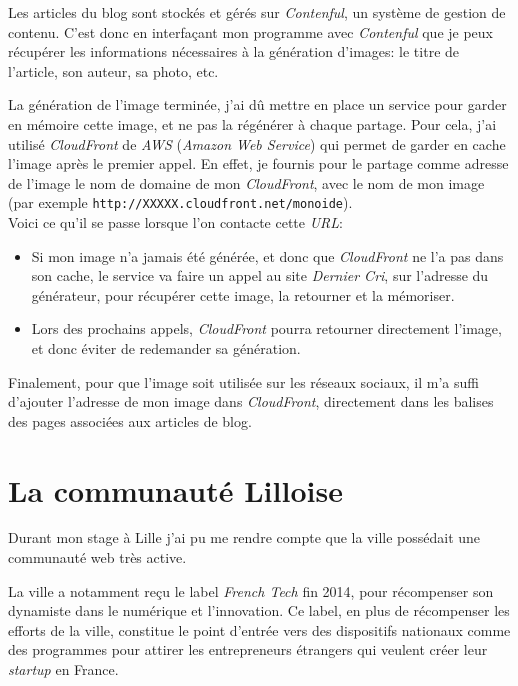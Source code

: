 \bigskip

Les articles du blog sont stockés et gérés sur \emph{Contenful}, un
système de gestion de contenu. C'est donc en interfaçant mon programme
avec \emph{Contenful} que je peux récupérer les informations nécessaires
à la génération d'images: le titre de l'article, son auteur, sa photo,
etc.

\bigskip

La génération de l'image terminée, j'ai dû mettre en place un service
pour garder en mémoire cette image, et ne pas la régénérer à chaque
partage. Pour cela, j'ai utilisé \emph{CloudFront} de \emph{AWS}
(\emph{Amazon Web Service}) qui permet de garder en cache l'image après
le premier appel. En effet, je fournis pour le partage comme adresse de
l'image le nom de domaine de mon \emph{CloudFront}, avec le nom de mon
image (par exemple \texttt{http://XXXXX.cloudfront.net/monoide}).\\
Voici ce qu'il se passe lorsque l'on contacte cette \emph{URL}:

\begin{itemize}
\item
  Si mon image n'a jamais été générée, et donc que \emph{CloudFront} ne
  l'a pas dans son cache, le service va faire un appel au site
  \emph{Dernier Cri}, sur l'adresse du générateur, pour récupérer cette
  image, la retourner et la mémoriser.
\item
  Lors des prochains appels, \emph{CloudFront} pourra retourner
  directement l'image, et donc éviter de redemander sa génération.
\end{itemize}

\bigskip

Finalement, pour que l'image soit utilisée sur les réseaux sociaux, il
m'a suffi d'ajouter l'adresse de mon image dans \emph{CloudFront},
directement dans les balises des pages associées aux articles de blog.

\newpage

\section{La communauté Lilloise}\label{la-communautuxe9-lilloise}

Durant mon stage à Lille j'ai pu me rendre compte que la ville possédait
une communauté web très active.

\bigskip

La ville a notamment reçu le label \emph{French Tech} fin 2014, pour
récompenser son dynamiste dans le numérique et l'innovation. Ce label,
en plus de récompenser les efforts de la ville, constitue le point
d'entrée vers des dispositifs nationaux comme des programmes pour
attirer les entrepreneurs étrangers qui veulent créer leur
\emph{startup} en France.

